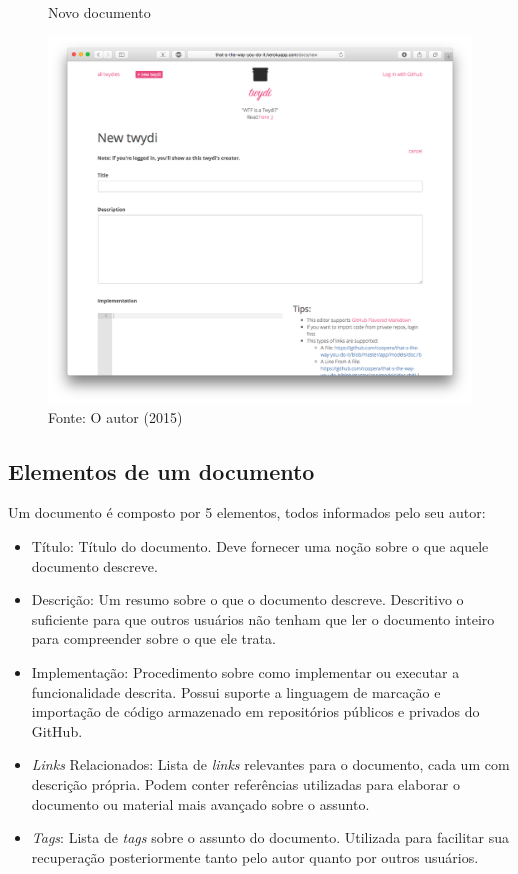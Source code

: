 \begin{figure}[h]
	\centering
    \caption{Novo documento}
    \includegraphics[width=15cm]{Imagens/print-new-twydi.png}
	\caption*{Fonte: O autor (2015)}
\end{figure}

\subsection{Elementos de um documento}

Um documento é composto por 5 elementos, todos informados pelo seu autor:

\begin{itemize}
  \item Título: Título do documento. Deve fornecer uma noção sobre o que aquele documento descreve.
  \item Descrição: Um resumo sobre o que o documento descreve. Descritivo o suficiente para que outros usuários não tenham que ler o documento inteiro para compreender sobre o que ele trata.
  \item Implementação: Procedimento sobre como implementar ou executar a funcionalidade descrita. Possui suporte a linguagem de marcação e importação de código armazenado em repositórios públicos e privados do GitHub.
   \item \textit{Links} Relacionados: Lista de \textit{links} relevantes para o documento, cada um com descrição própria. Podem conter referências utilizadas para elaborar o documento ou material mais avançado sobre o assunto.
  \item \textit{Tags}: Lista de \textit{tags} sobre o assunto do documento. Utilizada para facilitar sua recuperação posteriormente tanto pelo autor quanto por outros usuários.
\end{itemize}

